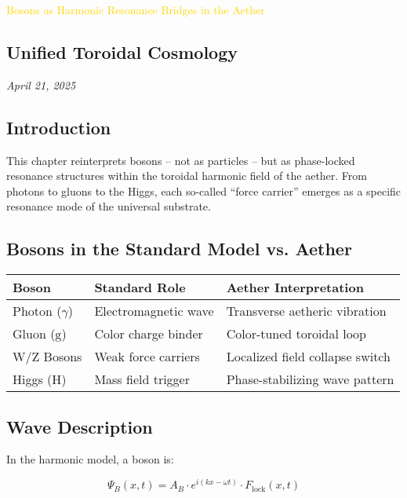 \textcolor{gold}{ Bosons as Harmonic Resonance Bridges in the Aether }

\subsection{Unified Toroidal Cosmology}

\textit{April 21, 2025}

\subsection{Introduction}

This chapter reinterprets bosons -- not as particles -- but as phase-locked resonance structures within the toroidal harmonic field of the aether. From photons to gluons to the Higgs, each so-called ``force carrier'' emerges as a specific resonance mode of the universal substrate.

\subsection{Bosons in the Standard Model vs. Aether}

\begin{center}
    \begin{tabular}{|l|l|p{5cm}|}
        \hline
        \textbf{Boson} & \textbf{Standard Role} & \textbf{Aether Interpretation} \\
        \hline
        Photon (\(\gamma\)) & Electromagnetic wave & Transverse aetheric vibration \\
        \hline
        Gluon (\(\mathrm{g}\)) & Color charge binder & Color-tuned toroidal loop \\
        \hline
        W/Z Bosons & Weak force carriers & Localized field collapse switch \\
        \hline
        Higgs (\(\mathrm{H}\)) & Mass field trigger & Phase-stabilizing wave pattern \\
        \hline
    \end{tabular}
\end{center}

\subsection{Wave Description}

In the harmonic model, a boson is:

\[
\Psi_B(x, t) = A_B \cdot e^{i (k x - \omega t)} \cdot F_{\text{lock}}(x, t)
\]


